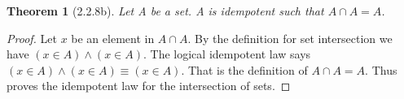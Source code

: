 \documentclass[a4paper, 12pt]{article}
\theoremstyle{plain}
\newtheorem*{theorem*}{Theorem}
\begin{document}
	
	\begin{theorem*}[2.2.8b]
		Let A be a set. A is idempotent such that $A \cap A = A$.
	\end{theorem*}
	
	\begin{proof}
		Let $x$ be an element in $A \cap A$. By the definition for set intersection we have $(x \in A) \land (x \in A)$. The logical idempotent law says \newline $(x \in A) \land (x \in A) \equiv (x \in A)$. That is the definition of $A \cap A = A$. Thus proves the idempotent law for the intersection of sets.
	\end{proof}
\end{document}
